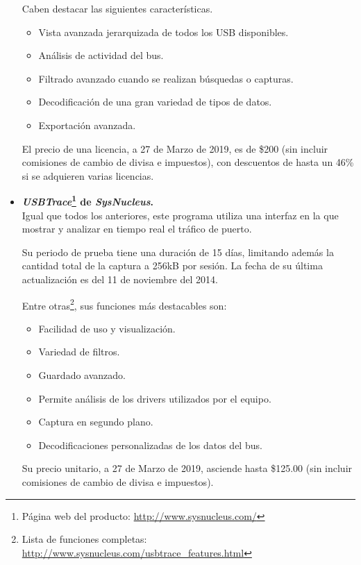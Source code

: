 \begin{itemize}
    Caben destacar las siguientes características.

    \begin{itemize}
        \item Vista avanzada jerarquizada de todos los USB disponibles.
        \item Análisis de actividad del bus.
        \item Filtrado avanzado cuando se realizan búsquedas o capturas.
        \item Decodificación de una gran variedad de tipos de datos.
        \item Exportación avanzada.
    \end{itemize}
    El precio de una licencia, a 27 de Marzo de 2019, es de \$200 (sin incluir comisiones de cambio de divisa e impuestos), con descuentos de hasta un 46\% si se adquieren varias licencias.

    \item \textbf{\emph{USBTrace}\footnote{Página web del producto: \url{http://www.sysnucleus.com/}} de \emph{SysNucleus}.} \\
    Igual que todos los anteriores, este programa utiliza una interfaz en la que mostrar y analizar en tiempo real el tráfico de puerto.

    Su periodo de prueba tiene una duración de 15 días, limitando además la cantidad total de la captura a 256kB por sesión. La fecha de su última actualización es del 11 de noviembre del 2014.

    Entre otras\footnote{Lista de funciones completas: \url{http://www.sysnucleus.com/usbtrace_features.html}}, sus funciones más destacables son:
    \begin{itemize}
        \item Facilidad de uso y visualización.
        \item Variedad de filtros.
        \item Guardado avanzado.
        \item Permite análisis de los drivers utilizados por el equipo. 
        \item Captura en segundo plano.
        \item Decodificaciones personalizadas de los datos del bus.
    \end{itemize}
    Su precio unitario, a 27 de Marzo de 2019, asciende hasta \$125.00 (sin incluir comisiones de cambio de divisa e impuestos).
\end{itemize}

